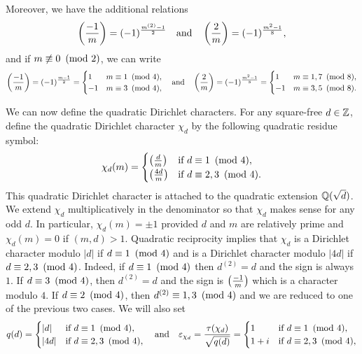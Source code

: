     Moreover, we have the additional relations
    \[
        \left(\frac{-1}{m}\right) = (-1)^{\frac{m^{(2)}-1}{2}} \quad \text{and} \quad \left(\frac{2}{m}\right) = (-1)^{\frac{m^{2}-1}{8}},
    \]
    and if $m \not\equiv 0 \ \left(\text{mod }2\right)$, we can write
    \[
        \left(\frac{-1}{m}\right) = (-1)^{\frac{m-1}{2}} = \begin{cases} 1 & \text{$m \equiv 1 \ \left(\text{mod }4\right)$}, \\ -1 & \text{$m \equiv 3 \ \left(\text{mod }4\right)$}, \end{cases} \quad \text{and} \quad \left(\frac{2}{m}\right) = (-1)^{\frac{m^{2}-1}{8}} = \begin{cases} 1 & \text{$m \equiv 1,7 \ \left(\text{mod }8\right)$}, \\ -1 & \text{$m \equiv 3,5 \ \left(\text{mod }8\right)$}. \end{cases}
    \]

    We can now define the quadratic Dirichlet characters. For any square-free $d \in \mathbb{Z}$, define the quadratic Dirichlet character $\chi_{d}$ by the following quadratic residue symbol:
    \[
        \chi_{d}(m) = \begin{cases} \left(\frac{d}{m}\right) & \text{if $d \equiv 1 \ \left(\text{mod }4\right)$}, \\ \left(\frac{4d}{m}\right) & \text{if $d \equiv 2,3 \ \left(\text{mod }4\right)$}. \end{cases}
    \]
    This quadratic Dirichlet character is attached to the quadratic extension $\mathbb{Q}(\sqrt{d})$. We extend $\chi_{d}$ multiplicatively in the denominator so that $\chi_{d}$ makes sense for any odd $d$. In particular, $\chi_{d}(m) = \pm1$ provided $d$ and $m$ are relatively prime and $\chi_{d}(m) = 0$ if $(m,d) > 1$. Quadratic reciprocity implies that $\chi_{d}$ is a Dirichlet character modulo $|d|$ if $d \equiv 1 \ \left(\text{mod }4\right)$ and is a Dirichlet character modulo $|4d|$ if $d \equiv 2,3 \ \left(\text{mod }4\right)$. Indeed, if $d \equiv 1 \ \left(\text{mod }4\right)$ then $d^{(2)} = d$ and the sign is always $1$. If $d \equiv 3 \ \left(\text{mod }4\right)$, then $d^{(2)} = d$ and the sign is $\textstyle{\left(\frac{-1}{m}\right)}$ which is a character modulo $4$. If $d \equiv 2 \ \left(\text{mod }4\right)$, then $d^{(2)} \equiv 1,3 \ \left(\text{mod }4\right)$ and we are reduced to one of the previous two cases. We will also set
    \[
        q(d) = \begin{cases} |d| & \text{if $d \equiv 1 \ \left(\text{mod }4\right)$}, \\ |4d| & \text{if $d \equiv 2,3 \ \left(\text{mod }4\right)$}, \end{cases} \quad \text{and} \quad \varepsilon_{\chi_{d}} = \frac{\tau(\chi_{d})}{\sqrt{q(d)}} = \begin{cases} 1 & \text{if $d \equiv 1 \ \left(\text{mod }4\right)$}, \\ 1+i & \text{if $d \equiv 2,3 \ \left(\text{mod }4\right)$}, \end{cases}
    \]
